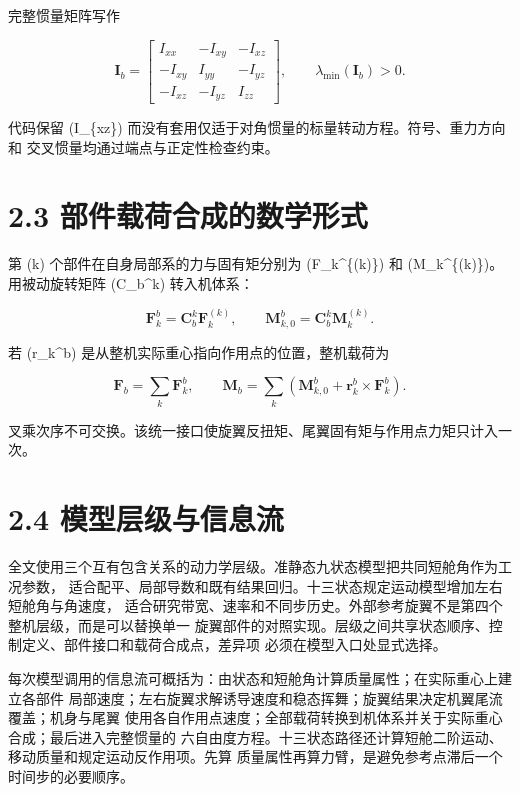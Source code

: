 \documentclass[UTF8,11pt,oneside,openany,fontset=windows]{ctexbook}
\begin{document}
完整惯量矩阵写作

\[
\mathbf I_b=\begin{bmatrix}I_{xx}&-I_{xy}&-I_{xz}\\-I_{xy}&I_{yy}&-I_{yz}\\-I_{xz}&-I_{yz}&I_{zz}\end{bmatrix},
\qquad \lambda_{\min}(\mathbf I_b)>0.
\]

代码保留 (I\_\{xz\})
而没有套用仅适于对角惯量的标量转动方程。符号、重力方向和
交叉惯量均通过端点与正定性检查约束。

\section{2.3
部件载荷合成的数学形式}\label{ux90e8ux4ef6ux8f7dux8377ux5408ux6210ux7684ux6570ux5b66ux5f62ux5f0f}

第 (k) 个部件在自身局部系的力与固有矩分别为 (\mathbf F\_k\^{}\{(k)\}) 和
(\mathbf M\_k\^{}\{(k)\})。用被动旋转矩阵 (\mathbf C\_b\^{}k)
转入机体系：

\[
\mathbf F_k^b=\mathbf C_b^k\mathbf F_k^{(k)},\qquad
\mathbf M_{k,0}^b=\mathbf C_b^k\mathbf M_k^{(k)}.
\]

若 (\mathbf r\_k\^{}b) 是从整机实际重心指向作用点的位置，整机载荷为

\[
\mathbf F_b=\sum_k\mathbf F_k^b,\qquad
\mathbf M_b=\sum_k\left(\mathbf M_{k,0}^b+\mathbf r_k^b\times\mathbf F_k^b\right).
\]

叉乘次序不可交换。该统一接口使旋翼反扭矩、尾翼固有矩与作用点力矩只计入一次。

\section{2.4
模型层级与信息流}\label{ux6a21ux578bux5c42ux7ea7ux4e0eux4fe1ux606fux6d41}

全文使用三个互有包含关系的动力学层级。准静态九状态模型把共同短舱角作为工况参数，
适合配平、局部导数和既有结果回归。十三状态规定运动模型增加左右短舱角与角速度，
适合研究带宽、速率和不同步历史。外部参考旋翼不是第四个整机层级，而是可以替换单一
旋翼部件的对照实现。层级之间共享状态顺序、控制定义、部件接口和载荷合成点，差异项
必须在模型入口处显式选择。

每次模型调用的信息流可概括为：由状态和短舱角计算质量属性；在实际重心上建立各部件
局部速度；左右旋翼求解诱导速度和稳态挥舞；旋翼结果决定机翼尾流覆盖；机身与尾翼
使用各自作用点速度；全部载荷转换到机体系并关于实际重心合成；最后进入完整惯量的
六自由度方程。十三状态路径还计算短舱二阶运动、移动质量和规定运动反作用项。先算
质量属性再算力臂，是避免参考点滞后一个时间步的必要顺序。
\end{document}
